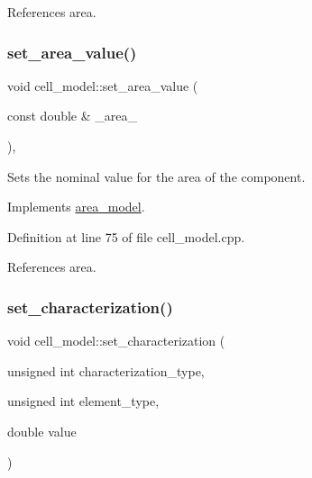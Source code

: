 References area.

\mbox{\label{classcell__model_a8b10f91f2160785c5b71d22af01eb127}} 
\subsubsection{\texorpdfstring{set\+\_\+area\+\_\+value()}{set\_area\_value()}}
{\footnotesize\ttfamily void cell\+\_\+model\+::set\+\_\+area\+\_\+value (\begin{DoxyParamCaption}\item[{const double \&}]{\+\_\+area\+\_\+ }\end{DoxyParamCaption})\hspace{0.3cm}{\ttfamily [override]}, {\ttfamily [virtual]}}



Sets the nominal value for the area of the component. 



Implements \hyperlink{classarea__model_a7c533a6a1b352493c04980d0734f89e5}{area\+\_\+model}.



Definition at line 75 of file cell\+\_\+model.\+cpp.



References area.

\mbox{\label{classcell__model_ad53bf535f932bfa0d1c18ee043ac28bb}} 
\subsubsection{\texorpdfstring{set\+\_\+characterization()}{set\_characterization()}}
{\footnotesize\ttfamily void cell\+\_\+model\+::set\+\_\+characterization (\begin{DoxyParamCaption}\item[{unsigned int}]{characterization\+\_\+type,  }\item[{unsigned int}]{element\+\_\+type,  }\item[{double}]{value }\end{DoxyParamCaption})}




